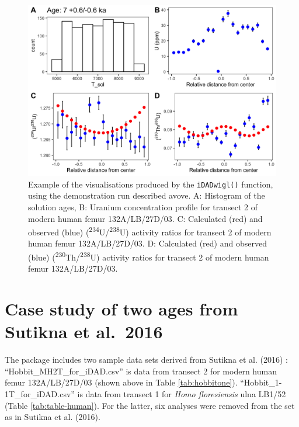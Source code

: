 \documentclass[]{elsarticle} %
\begin{document}
\begin{figure}
\includegraphics[width=0.95\linewidth]{figures/demo-panel-fig} \caption{Example of the visualisations produced by the \texttt{iDADwigl()} function, using the demonstration run described avove. A: Histogram of the solution ages, B: Uranium concentration profile for transect 2 of modern human femur 132A/LB/27D/03. C: Calculated (red) and observed (blue) (\textsuperscript{234}U/\textsuperscript{238}U) activity ratios for transect 2 of modern human femur 132A/LB/27D/03. D: Calculated (red) and observed (blue) (\textsuperscript{230}Th/\textsuperscript{238}U) activity ratios for transect 2 of modern human femur 132A/LB/27D/03.}\label{fig:demopanelfig}
\end{figure}

\FloatBarrier

\newpage

\hypertarget{case-study-of-two-ages-from-sutikna-et-al.2016}{%
\section{Case study of two ages from Sutikna et al.~2016}\label{case-study-of-two-ages-from-sutikna-et-al.2016}}

The package includes two sample data sets derived from Sutikna et al. (2016) : ``Hobbit\_MH2T\_for\_iDAD.csv'' is data from transect 2 for modern human femur 132A/LB/27D/03 (shown above in Table \ref{tab:hobbitone}). ``Hobbit\_1-1T\_for\_iDAD.csv'' is data from transect 1 for \emph{Homo floresiensis} ulna LB1/52 (Table \ref{tab:table-human}). For the latter, six analyses were removed from the set as in Sutikna et al. (2016).
\end{document}
